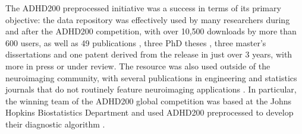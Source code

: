 \documentclass[preprint,12pt,3p]{elsarticle}
\begin{document}
The ADHD200 preprocessed initiative was a success in terms of its primary objective: the data repository was effectively used by many researchers during and after the ADHD200 competition, with over 10,500 downloads by more than 600 users, as well as 49 publications \cite{Rangarajan2014, Liang2012, Tabas2014, Rangarajan2015, Mahanand2013, Lifshitz2012, Fujita2013, Ji2011, Li2015, Li2013, Liu2012, DosSantosSiqueira2014, Olivetti2014, Han2015, Wang2013a, Subramanian2013, Dey2014, Bellec2012, Bohland2012, Chang2012, Cheng2012, Colby2012, Dai2012, Dey2012, Eloyan2012, Olivetti2012, Sato2012a, Carmona2015, Carmona2015a, Hou2015, Deshpande2015, She2014, Lavoie-Courchesne2012b, Chen2015, Nunez-Garcia2015, Solmaz2012, Anderson2014, KadkhodaeianBakhtiari2012, Sato2013, Kyeong2015, Sato2012, Takahashi2012, He2013, Kong2013, Yao2013, Yang2015, Ahn2015, Fujita2014, Reiss2014}, three PhD theses \cite{Colby2012a, Dey2013, Zhang2012}, three master's dissertations \cite{VanGalenLast2011, Vidal2014, Wang2013} and one patent \cite{Dey2013} derived from the release in just over 3 years, with more in press or under review. The resource was also used outside of the neuroimaging community, with several publications in engineering and statistics journals that do not routinely feature neuroimaging applications \citep[e.g.][]{Liang2012, Rangarajan2015, Rangarajan2014, Mahanand2013, Ji2011, Li2015, Li2013, Liu2012, Subramanian2013, Hou2015, Deshpande2015, She2014, Chen2015, He2013, Kong2013, Yang2015, Ahn2015}. In particular, the winning team of the ADHD200 global competition was based at the Johns Hopkins Biostatistics Department and used ADHD200 
preprocessed to develop their diagnostic algorithm \cite{Eloyan2012}.
\par 
\end{document}
